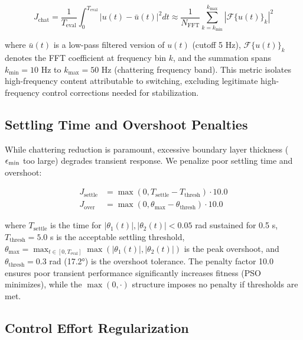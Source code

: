 \begin{equation}
\label{eq:chattering_index}
J_{\text{chat}} = \frac{1}{T_{\text{eval}}} \int_0^{T_{\text{eval}}} |u(t) - \bar{u}(t)|^2 dt \approx \frac{1}{N_{\text{FFT}}} \sum_{k=k_{\text{min}}}^{k_{\text{max}}} |\mathcal{F}\{u(t)\}_k|^2
\end{equation}

where $\bar{u}(t)$ is a low-pass filtered version of $u(t)$ (cutoff 5 Hz), $\mathcal{F}\{u(t)\}_k$ denotes the FFT coefficient at frequency bin $k$, and the summation spans $k_{\text{min}} = 10$ Hz to $k_{\text{max}} = 50$ Hz (chattering frequency band). This metric isolates high-frequency content attributable to switching, excluding legitimate high-frequency control corrections needed for stabilization.

\subsection{Settling Time and Overshoot Penalties}
\label{subsec:transient_penalties}

While chattering reduction is paramount, excessive boundary layer thickness ($\epsilon_{\min}$ too large) degrades transient response. We penalize poor settling time and overshoot:

\begin{align}
\label{eq:settling_penalty}
J_{\text{settle}} &= \max(0, T_{\text{settle}} - T_{\text{thresh}}) \cdot 10.0 \\
\label{eq:overshoot_penalty}
J_{\text{over}} &= \max(0, \theta_{\max} - \theta_{\text{thresh}}) \cdot 10.0
\end{align}

where $T_{\text{settle}}$ is the time for $|\theta_1(t)|, |\theta_2(t)| < 0.05$ rad sustained for 0.5 s, $T_{\text{thresh}} = 5.0$ s is the acceptable settling threshold, $\theta_{\max} = \max_{t \in [0, T_{\text{eval}}]} \max(|\theta_1(t)|, |\theta_2(t)|)$ is the peak overshoot, and $\theta_{\text{thresh}} = 0.3$ rad (17.2°) is the overshoot tolerance. The penalty factor 10.0 ensures poor transient performance significantly increases fitness (PSO minimizes), while the $\max(0, \cdot)$ structure imposes no penalty if thresholds are met.

\subsection{Control Effort Regularization}
\label{subsec:control_effort}

